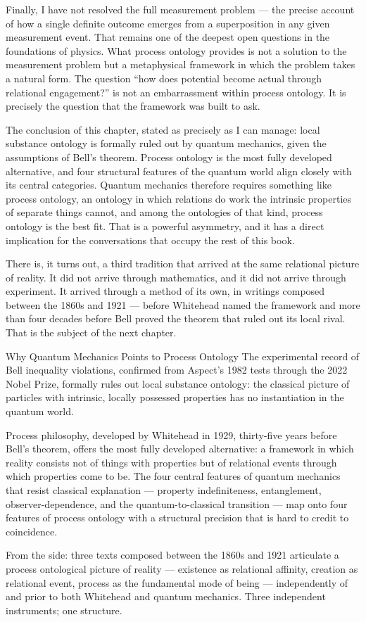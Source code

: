Finally, I have not resolved the full measurement problem --- the precise account
of how a single definite outcome emerges from a superposition in any given
measurement event.
That remains one of the deepest open questions in the foundations of physics.
What process ontology provides is not a solution to the measurement problem but
a metaphysical framework in which the problem takes a natural form.
The question ``how does potential become actual through relational engagement?''
is not an embarrassment within process ontology.
It is precisely the question that the framework was built to ask.

The conclusion of this chapter, stated as precisely as I can manage: local
substance ontology is formally ruled out by quantum mechanics, given the
assumptions of Bell's theorem.
Process ontology is the most fully developed alternative, and four structural
features of the quantum world align closely with its central categories.
Quantum mechanics therefore requires something like process ontology, an
ontology in which relations do work the intrinsic properties of separate things
cannot, and among the ontologies of that kind, process ontology is the best fit.
That is a powerful asymmetry, and it has a direct implication for the
conversations that occupy the rest of this book.

There is, it turns out, a third tradition that arrived at the same relational
picture of reality.
It did not arrive through mathematics, and it did not arrive through experiment.
It arrived through a method of its own, in writings composed between the 1860s and
1921 --- before Whitehead named the framework and more than four decades before
Bell proved the theorem that ruled out its local rival.
That is the subject of the next chapter.

\begin{convergencemoment}{Why Quantum Mechanics Points to Process Ontology}
The experimental record of Bell inequality violations, confirmed from Aspect's
1982 tests through the 2022 Nobel Prize, formally rules out local substance
ontology: the classical picture of particles with intrinsic, locally possessed
properties has no instantiation in the quantum world.

Process philosophy, developed by Whitehead in 1929, thirty-five years before
Bell's theorem, offers the most fully developed alternative: a framework in which
reality consists not of things with properties but of relational events through
which properties come to be.
The four central features of quantum mechanics that resist classical explanation
--- property indefiniteness, entanglement, observer-dependence, and the
quantum-to-classical transition --- map onto four features of
process ontology with a structural precision that is hard to credit to
coincidence.

From the \bahai side: three texts composed between the 1860s and 1921 articulate
a process ontological picture of reality --- existence as relational affinity,
creation as relational event, process as the fundamental mode of being ---
independently of and prior to both Whitehead and quantum mechanics.
Three independent instruments; one structure.
\end{convergencemoment}
